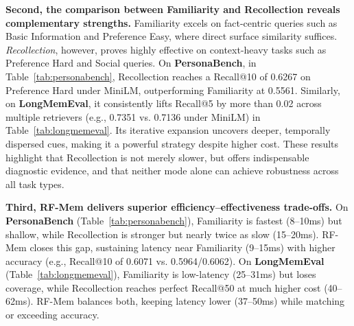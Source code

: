 \textbf{Second, the comparison between Familiarity and Recollection reveals complementary strengths.}  
Familiarity excels on fact-centric queries such as Basic Information and Preference Easy, where direct surface similarity suffices. \emph{Recollection}, however, proves highly effective on context-heavy tasks such as Preference Hard and Social queries. On \textbf{PersonaBench}, in Table~\ref{tab:personabench}, Recollection reaches a Recall@10 of 0.6267 on Preference Hard under MiniLM, outperforming Familiarity at 0.5561. Similarly, on \textbf{LongMemEval}, it consistently lifts Recall@5 by more than 0.02 across multiple retrievers (e.g., 0.7351 vs. 0.7136 under MiniLM) in Table~\ref{tab:longmemeval}. Its iterative expansion uncovers deeper, temporally dispersed cues, making it a powerful strategy despite higher cost. These results highlight that Recollection is not merely slower, but offers indispensable diagnostic evidence, and that neither mode alone can achieve robustness across all task types.

\textbf{Third, RF-Mem delivers superior efficiency–effectiveness trade-offs.}  
On \textbf{PersonaBench} (Table~\ref{tab:personabench}), Familiarity is fastest (8–10ms) but shallow, while Recollection is stronger but nearly twice as slow (15–20ms). RF-Mem closes this gap, sustaining latency near Familiarity (9–15ms) with higher accuracy (e.g., Recall@10 of 0.6071 vs. 0.5964/0.6062).  
On \textbf{LongMemEval} (Table~\ref{tab:longmemeval}), Familiarity is low-latency (25–31ms) but loses coverage, while Recollection reaches perfect Recall@50 at much higher cost (40–62ms). RF-Mem balances both, keeping latency lower (37–50ms) while matching or exceeding accuracy.




